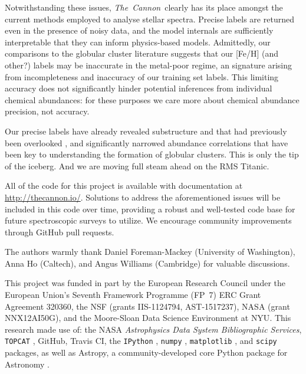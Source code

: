 \documentclass[12pt,preprint]{aastex}
\newcommand{\project}[1]{\textsl{#1}}
\newcommand{\TheCannon}{\project{The~Cannon}}
\newcommand{\acronym}[1]{{\small{#1}}}
\begin{document}
Notwithstanding these issues, \TheCannon\ clearly has its place amongst
the current methods employed to analyse stellar spectra.  Precise labels
are returned even in the presence of noisy data, and the model internals
are sufficiently interpretable that they can inform physics-based models.
Admittedly, our comparisons to the globular cluster literature suggests
that our [Fe/H] (and other?) labels may be inaccurate in the metal-poor
regime, an signature arising from incompleteness and inaccuracy of our
training set labels.  This limiting accuracy does not significantly
hinder potential inferences from individual chemical abundances: for
these purposes we care more about chemical abundance precision, not
accuracy.


Our precise labels have already revealed substructure and that had previously
been overlooked \citep{Hogg_2016}, and significantly narrowed abundance
correlations that have been key to understanding the formation of globular
clusters.  This is only the tip of the iceberg.  And we are moving full
steam ahead on the RMS Titanic. 


All of the code for this project is available with documentation at \url{http://thecannon.io/}.  Solutions to address the aforementioned issues will be
included in this code over time, providing a robust and well-tested code base for 
future spectroscopic surveys to utilize.  We encourage community 
improvements through GitHub pull requests.








\acknowledgements
The authors warmly thank Daniel Foreman-Mackey (University of Washington),
						 Anna Ho (Caltech), and
						 Angus Williams (Cambridge) for valuable discussions.
						 
This project was funded in part by
  the European Research Council under the European Union's Seventh Framework 
  Programme (FP~7) \acronym{ERC} Grant Agreement 320360,
  the \acronym{NSF} (grants \acronym{IIS-1124794}, \acronym{AST-1517237}),
  \acronym{NASA} (grant \acronym{NNX12AI50G}), and 
  the Moore-Sloan Data Science Environment at \acronym{NYU}.
This research made use of: 
  the \acronym{NASA} \project{Astrophysics Data System Bibliographic Services},
  \texttt{TOPCAT} \citep{Taylor_2005},
  GitHub, 
  Travis CI, the
  \texttt{IPython} \citep{Perez_2007}, 
  \texttt{numpy} \citep{van_der_Walt_2011}, 
  \texttt{matplotlib} \citep{Hunter_2007}, and
  \texttt{scipy} \citep{Jones_2001} packages, as well as
  Astropy, a community-developed core Python package for Astronomy \citep{astropy}.
\end{document}
